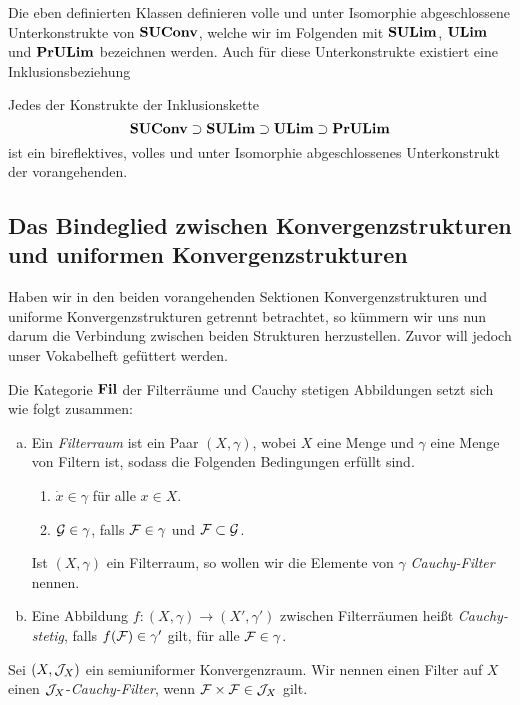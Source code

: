 Die eben definierten Klassen definieren volle und unter Isomorphie abgeschlossene Unterkonstrukte von $\mathbf{SUConv}$, welche wir im Folgenden mit $\mathbf{SULim}$, $\mathbf{ULim}$ und $\mathbf{PrULim}$ bezeichnen werden.
Auch für diese Unterkonstrukte existiert eine Inklusionsbeziehung

\begin{prop}
  Jedes der Konstrukte der Inklusionskette
  $$
  \mathbf{SUConv} \supset \mathbf{SULim} \supset \mathbf{ULim} \supset \mathbf{PrULim}
  $$
  ist ein bireflektives, volles und unter Isomorphie abgeschlossenes Unterkonstrukt der vorangehenden.
\end{prop}


\subsection[Das Bindeglied zwischen beiden Strukturen]{Das Bindeglied zwischen Konvergenzstrukturen und uniformen Konvergenzstrukturen}

Haben wir in den beiden vorangehenden Sektionen Konvergenzstrukturen und uniforme Konvergenzstrukturen getrennt betrachtet, so kümmern wir uns nun darum die Verbindung zwischen beiden Strukturen herzustellen.
Zuvor will jedoch unser Vokabelheft gefüttert werden.

\begin{defn}
  Die Kategorie $\mathbf{Fil}$ der Filterräume und Cauchy stetigen Abbildungen setzt sich wie folgt zusammen:
  \begin{enumerate}[a)]
    \item Ein \emph{Filterraum} ist ein Paar $(X, \gamma)$, wobei $X$ eine Menge und $\gamma$ eine Menge von Filtern ist, sodass die Folgenden Bedingungen erfüllt sind.
      \begin{enumerate}[F1)]
        \item $\dot x \in \gamma$ für alle $x \in X$.
        \item $\mathcal{G} \in \gamma$, falls $\mathcal{F} \in \gamma$ und $\mathcal{F} \subset \mathcal{G}$.
      \end{enumerate}
      Ist $(X,\gamma)$ ein Filterraum, so wollen wir die Elemente von $\gamma$ \emph{Cauchy-Filter} nennen.
    \item Eine Abbildung $f \colon (X, \gamma) \to (X', \gamma')$ zwischen Filterräumen heißt \emph{Cauchy-stetig}, falls $f(\mathcal{F}) \in \gamma'$ gilt, für alle $\mathcal{F} \in \gamma$.
  \end{enumerate}
\end{defn}

\begin{defn}
  Sei $(X, \mathcal{J}_X)$ ein semiuniformer Konvergenzraum.
  Wir nennen einen Filter auf $X$ einen $\mathcal{J}_X$-\emph{Cauchy-Filter}, wenn $\mathcal{F} \times \mathcal{F} \in \mathcal{J}_X$ gilt.
\end{defn}

